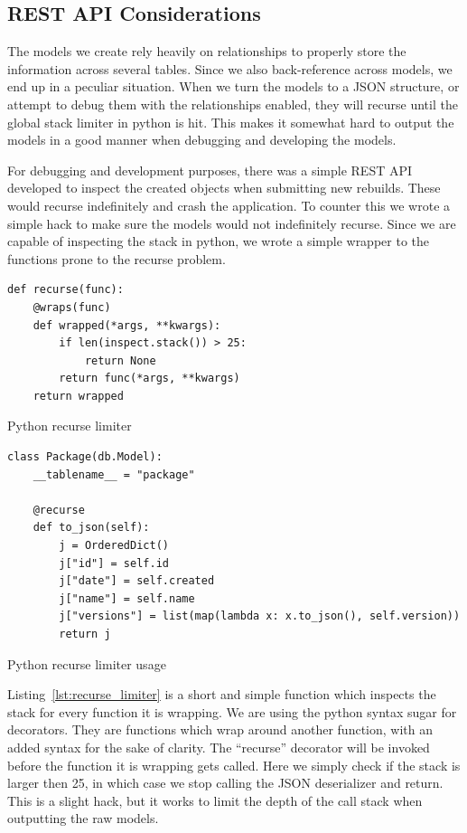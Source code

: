 \documentclass[../Main/thesis.tex]{subfiles}
\begin{document}
\subsection*{REST API Considerations}%
\label{sub:api_considerations}
The models we create rely heavily on relationships to properly store the
information across several tables. Since we also back-reference across models,
we end up in a peculiar situation. When we turn the models to a JSON structure,
or attempt to debug them with the relationships enabled, they will recurse until
the global stack limiter in python is hit. This makes it somewhat hard to output
the models in a good manner when debugging and developing the models.

For debugging and development purposes, there was a simple REST API developed to
inspect the created objects when submitting new rebuilds. These would recurse
indefinitely and crash the application. To counter this we wrote a simple hack
to make sure the models would not indefinitely recurse. Since we are capable of
inspecting the stack in python, we wrote a simple wrapper to the functions prone
to the recurse problem.

\begin{listing}
\begin{verbatim}
def recurse(func):
    @wraps(func)
    def wrapped(*args, **kwargs):
        if len(inspect.stack()) > 25:
            return None
        return func(*args, **kwargs)
    return wrapped
\end{verbatim}
\caption{Python recurse limiter}
\label{lst:recurse_limiter}
\end{listing}

\begin{listing}
\begin{verbatim}
class Package(db.Model):
    __tablename__ = "package"

    @recurse
    def to_json(self):
        j = OrderedDict()
        j["id"] = self.id
        j["date"] = self.created
        j["name"] = self.name
        j["versions"] = list(map(lambda x: x.to_json(), self.version))
        return j

\end{verbatim}
\caption{Python recurse limiter usage}
\label{lst:recurse_limiter_usage}
\end{listing}

Listing~\ref{lst:recurse_limiter} is a short and simple function which inspects
the stack for every function it is wrapping. We are using the python syntax
sugar for decorators. They are functions which wrap around another function,
with an added syntax for the sake of clarity. The ``recurse'' decorator will be
invoked before the function it is wrapping gets called. Here we simply check if
the stack is larger then 25, in which case we stop calling the JSON deserializer
and return. This is a slight hack, but it works to limit the depth of the
call stack when outputting the raw models.
\end{document}
